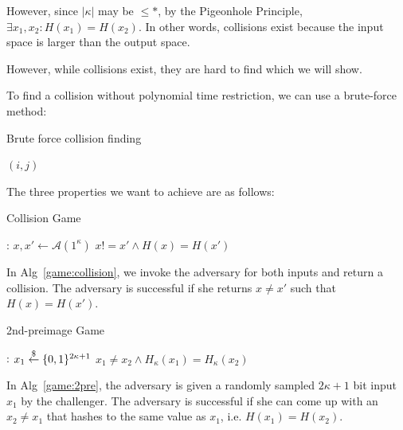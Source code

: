 However, since $|\kappa|$ may be $\leq *$, by the Pigeonhole Principle, $\exists x_1, x_2: H(x_1)=H(x_2)$. In other words, collisions exist because the input space is larger than the output space.

However, while collisions exist, they are hard to find which we will show.

To find a collision without polynomial time restriction, we can use a brute-force method: \\
\begin{algorithm}
\caption{Brute force collision finding}
\label{a'2}
\begin{algorithmic}[1]
        \State \Return $(i,j)$
    \EndIf
    \EndFor
    \EndFor
\EndFunction
\end{algorithmic}
\end{algorithm}


The three properties we want to achieve are as follows:


\begin{algorithm}[H]
\caption{Collision Game}
\label{game:collision}
\begin{algorithmic}[1]
: \State $x, x' \leftarrow \mathcal{A}
(1^{\kappa})$    
\State \Return $x != x' \wedge H(x) = H(x')$
\EndFunction
\end{algorithmic}
\end{algorithm}

In Alg~\ref{game:collision}, we invoke the adversary for both inputs and return a collision. The adversary is successful if she returns $x\ne x'$ such that $H(x)=H(x')$.

\begin{algorithm}[H]
\caption{2nd-preimage Game}
\label{game:2pre}
\begin{algorithmic}[1]
:
    \State $x_1 \overset{\$}{\gets} \{0,1\}^{2\kappa+1}$
    \State \Return $x_1 \neq x_2 \wedge H_\kappa(x_1) = H_\kappa(x_2)$
\EndFunction
\end{algorithmic}
\end{algorithm}

In Alg~\ref{game:2pre}, the adversary is given a randomly sampled $2\kappa+1$ bit input $x_1$ by the challenger. The adversary is successful if she can come up with an $x_2 \neq x_1$ that hashes to the same value as $x_1$, i.e. $H(x_1) = H(x_2)$.

